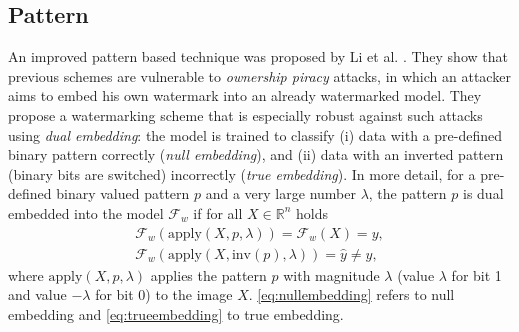 \subsection{Pattern} \label{sec:black-box:pattern}
An improved pattern based technique was proposed by Li et al. \cite{li_piracy_2020}. They show that previous schemes \cite{adi_turning_2018, zhang_protecting_2018} are vulnerable to \textit{ownership piracy} attacks, in which an attacker aims to embed his own watermark into an already watermarked model. They propose a watermarking scheme that is especially robust against such attacks using \textit{dual embedding}: %
the model is trained to classify (i) data with a pre-defined binary pattern correctly (\textit{null embedding}), and (ii) data with an inverted pattern (binary bits are switched) incorrectly (\textit{true embedding}). 
In more detail, for a pre-defined binary valued pattern $p$ and a very large number $\lambda$, the pattern $p$ is dual embedded into the model $\mathcal{F}_w$ if for all $X \in \mathbb{R}^n$ holds
\begin{align}
     \mathcal{F}_w(\mathrm{apply}(X, p, \lambda)) = \mathcal{F}_w(X) = y, \label{eq:nullembedding} \\ 
     \mathcal{F}_w(\mathrm{apply}(X, \mathrm{inv}(p), \lambda)) = \hat{y} \neq y, \label{eq:trueembedding}
\end{align}
where $\mathrm{apply}(X, p, \lambda)$ applies the pattern $p$ with magnitude $\lambda$ (value $\lambda$ for bit 1 and value $-\lambda$ for bit 0) to the image $X$. \cref{eq:nullembedding} refers to null embedding and \cref{eq:trueembedding} to true embedding.
